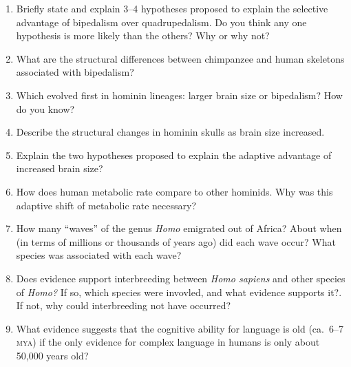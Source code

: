 \documentclass[letterpaper]{tufte-handout}
\begin{document}
\begin{enumerate}

	\item Briefly state and explain 3--4 hypotheses proposed to explain the selective advantage of bipedalism over quadrupedalism.  Do you think any one hypothesis is more likely than the others?  Why or why not?
	
	\item What are the structural differences between chimpanzee and human skeletons associated with bipedalism?

	\item Which evolved first in hominin lineages: larger brain size or bipedalism? How do you know?
	
	\item Describe the structural changes in hominin skulls as brain size increased.
	
	\item Explain the two hypotheses proposed to explain the adaptive advantage of increased brain size?
	
	\item How does human metabolic rate compare to other hominids. Why was this adaptive shift of metabolic rate necessary?

	\item How many “waves” of the genus \textit{Homo} emigrated out of Africa? About when (in terms of millions or thousands of years ago) did each wave occur? What species was associated with each wave?
	
	\item Does evidence support interbreeding between \textit{Homo sapiens} and other species of \textit{Homo?} If so, which species were invovled, and what evidence supports it?. If not, why could interbreeding not have occurred?
	
	\item What evidence suggests that the cognitive ability for language is old (ca.~6–7 \textsc{mya}) if the only evidence for complex language in humans is only about 50,000 years old?
	

\end{enumerate}
\end{document}
